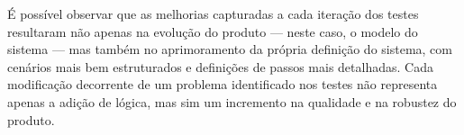
É possível observar que as melhorias capturadas a cada iteração dos testes resultaram não apenas na evolução do produto — neste caso, o modelo do sistema — mas também 
no aprimoramento da própria definição do sistema, com cenários mais bem estruturados e definições de passos mais detalhadas. Cada modificação decorrente de um problema 
identificado nos testes não representa apenas a adição de lógica, mas sim um incremento na qualidade e na robustez do produto.

